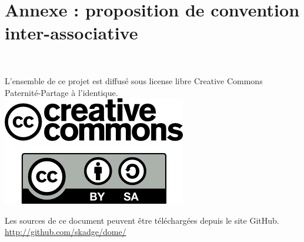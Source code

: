 \documentclass[a4paper,12pt]{report}
\begin{document}
\chapter{Annexe : proposition de convention inter-associative}


\clearpage
\thispagestyle{empty}
~
\vfill
\begin{center}
	L'ensemble de ce projet est diffusé sous license libre Creative Commons Paternité-Partage à l'identique.\\
	\vspace{2cm}
	\includegraphics[scale=0.5]{logo_cc.png}
\end{center}

\vfill

\begin{center}
	Les sources de ce document peuvent être téléchargées depuis le site GitHub.
	\url{http://github.com/skadge/dome/}
\end{center}

\vfill
\end{document}
